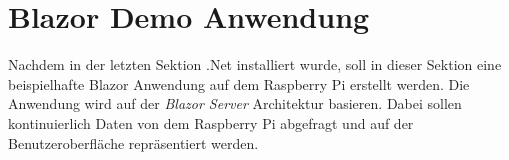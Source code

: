 \section{Blazor Demo Anwendung}
\label{sec:blazordemo}
Nachdem in der letzten Sektion \emph{} .Net installiert wurde, soll in
dieser Sektion eine beispielhafte Blazor Anwendung auf dem Raspberry Pi erstellt werden. Die
Anwendung wird auf der \emph{Blazor Server} Architektur basieren. Dabei sollen kontinuierlich
Daten von dem Raspberry Pi abgefragt und auf der Benutzeroberfläche repräsentiert werden.




